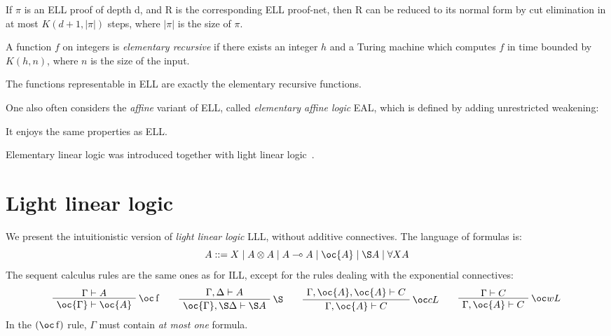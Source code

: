 \begin{theorem}
If $\pi$ is an ELL proof of depth d, and R is the corresponding ELL proof-net, then R can be reduced to its normal form by cut elimination in at most $ K(d+1,|\pi|)$ steps, where $|\pi|$ is the size of $\pi$.
\end{theorem}

A function $f$ on integers is \emph{elementary recursive} if there exists
an integer $h$ and a Turing machine which computes $f$ in time bounded by
\(K(h,n)\), where $n$ is the size of the input.

\begin{theorem}
The functions representable in  ELL are exactly the elementary recursive functions.
\end{theorem}

One also often considers the \emph{affine} variant of ELL, called
\emph{elementary affine logic} EAL, which is defined by adding
unrestricted weakening:
\begin{prooftree}
\end{prooftree}
It enjoys the same properties as ELL.

Elementary linear logic was introduced together with light linear logic~\cite{lightlinearlogic}.

\section{Light linear logic}\label{light-linear-logic}

We present the intuitionistic version of \emph{light linear logic} LLL,
without additive connectives. The language of formulas is:
\begin{equation*}
A ::= X \mid A\tens A \mid A\limp A  \mid \oc{A} \mid \pg{A} \mid \forall X A
\end{equation*}
The sequent calculus rules are the same ones as for ILL, except for the
rules dealing with the exponential connectives:
\begin{equation*}
\AxRule{\Gamma\vdash A}
\LabelRule{\oc\rulename{f} }
\UnaRule{\oc{\Gamma}\vdash\oc{A}}
\DisplayProof
\qquad
\AxRule{\Gamma, \Delta\vdash A}
\LabelRule{\pg }
\UnaRule{\oc{\Gamma}, \pg \Delta\vdash\pg{A}}
\DisplayProof
\qquad
\AxRule{\Gamma,\oc{A},\oc{A}\vdash C}
\LabelRule{\oc c L}
\UnaRule{\Gamma,\oc{A}\vdash C}
\DisplayProof
\qquad
\AxRule{\Gamma\vdash C}
\LabelRule{\oc w L}
\UnaRule{\Gamma,\oc{A}\vdash C}
\DisplayProof
\end{equation*}
In the \((\oc\rulename{f})\) rule, \(\Gamma\) must contain \emph{at most one} formula.

